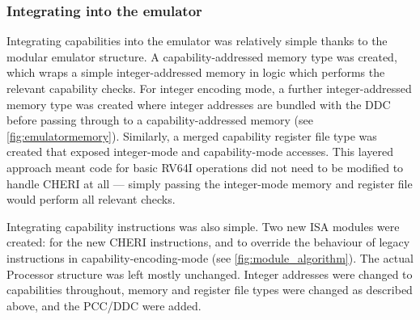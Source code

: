 \subsubsection{Integrating into the emulator}
Integrating capabilities into the emulator was relatively simple thanks to the modular emulator structure.
A capability-addressed memory type was created, which wraps a simple integer-addressed memory in logic which performs the relevant capability checks.
For integer encoding mode, a further integer-addressed memory type was created where integer addresses are bundled with the DDC before passing through to a capability-addressed memory (see \cref{fig:emulatormemory}).
Similarly, a merged capability register file type was created that exposed integer-mode and capability-mode accesses.
This layered approach meant code for basic RV64I operations did not need to be modified to handle CHERI at all --- simply passing the integer-mode memory and register file would perform all relevant checks.

Integrating capability instructions was also simple.
Two new ISA modules were created:  for the new CHERI instructions, and  to override the behaviour of legacy instructions in capability-encoding-mode (see \cref{fig:module_algorithm}).
The actual Processor structure was left mostly unchanged.
Integer addresses were changed to capabilities throughout,
memory and register file types were changed as described above, and the PCC/DDC were added.

